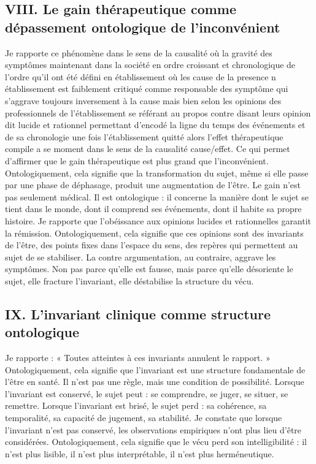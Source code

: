 \documentclass[12pt,a4paper]{article}
\begin{document}
\subsection*{VIII. Le gain thérapeutique comme dépassement ontologique de l’inconvénient}
Je rapporte ce phénomène dans le sens de la causalité où la gravité des symptômes maintenant dans  la société en ordre croissant et chronologique de l’ordre qu’il ont été défini en établissement où les cause de la presence n établissement est faiblement critiqué comme responsable des symptôme qui s’aggrave toujours inversement à la cause  mais bien selon les opinions des professionnels de l’établissement se référant au propos contre disant leurs opinion dit lucide et rationnel permettant d’encodé la ligne du temps des événements et de sa chronologie une fois l’établissement quitté alors l’effet thérapeutique compile a se moment dans le sens de la causalité cause/effet. Ce qui permet d’affirmer que le gain thérapeutique est plus grand que l’inconvénient. Ontologiquement, cela signifie que la transformation du sujet, même si elle passe par une phase de déphasage, produit une augmentation de l’être.
Le gain n’est pas seulement médical. Il est ontologique : il concerne la manière dont le sujet se tient dans le monde, dont il comprend ses événements, dont il habite sa propre histoire.
Je rapporte que l’obéissance aux opinions lucides et rationnelles garantit la rémission. Ontologiquement, cela signifie que ces opinions sont des invariants de l’être, des points fixes dans l’espace du sens, des repères qui permettent au sujet de se stabiliser.
La contre argumentation, au contraire, aggrave les symptômes. Non pas parce qu’elle est fausse, mais parce qu’elle désoriente le sujet, elle fracture l’invariant, elle déstabilise la structure du vécu.

\subsection*{IX. L’invariant clinique comme structure ontologique}
Je rapporte :
« Toutes atteintes à ces invariants annulent le rapport. »
Ontologiquement, cela signifie que l’invariant est une structure fondamentale de l’être en santé. Il n’est pas une règle, mais une condition de possibilité.
Lorsque l’invariant est conservé, le sujet peut :
	se comprendre,
	se juger,
	se situer,
	se remettre.
Lorsque l’invariant est brisé, le sujet perd :
	sa cohérence,
	sa temporalité,
	sa capacité de jugement,
	sa stabilité.
Je constate que lorsque l’invariant n’est pas conservé, les observations empiriques n’ont plus lieu d’être considérées. Ontologiquement, cela signifie que le vécu perd son intelligibilité : il n’est plus lisible, il n’est plus interprétable, il n’est plus herméneutique.
\end{document}
